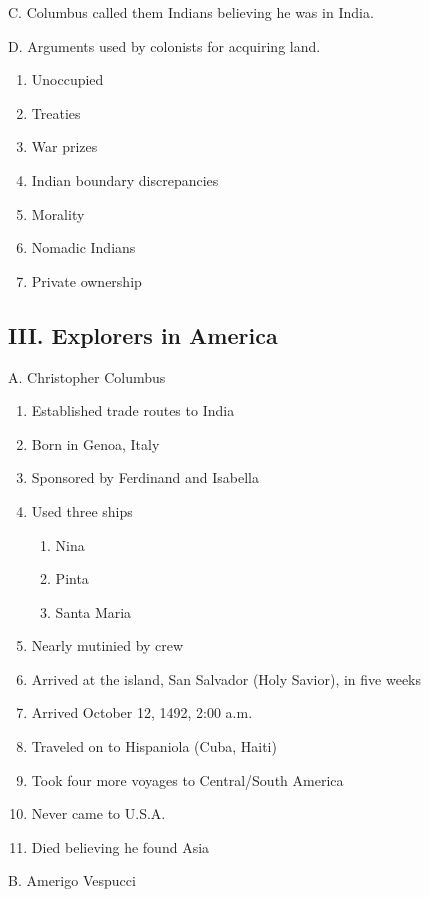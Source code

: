 \documentclass{article}
\begin{document}
\noindent C. Columbus called them Indians believing he was in India.

\noindent D. Arguments used by colonists for acquiring land.

\begin{enumerate}
    \item Unoccupied
    \item Treaties
    \item War prizes
    \item Indian boundary discrepancies
    \item Morality
    \item Nomadic Indians
    \item Private ownership
\end{enumerate}

\subsection*{III. Explorers in America}

\noindent A. Christopher Columbus

\begin{enumerate}
    \item Established trade routes to India
    \item Born in Genoa, Italy
    \item Sponsored by Ferdinand and Isabella
    \item Used three ships
        \begin{enumerate}
            \item Nina
            \item Pinta
            \item Santa Maria
        \end{enumerate}
    \item Nearly mutinied by crew
    \item Arrived at the island, San Salvador (Holy Savior), in five weeks
    \item Arrived October 12, 1492, 2:00 a.m.
    \item Traveled on to Hispaniola (Cuba, Haiti)
    \item Took four more voyages to Central/South America
    \item Never came to U.S.A.
    \item Died believing he found Asia
\end{enumerate}

\noindent B. Amerigo Vespucci
\end{document}

